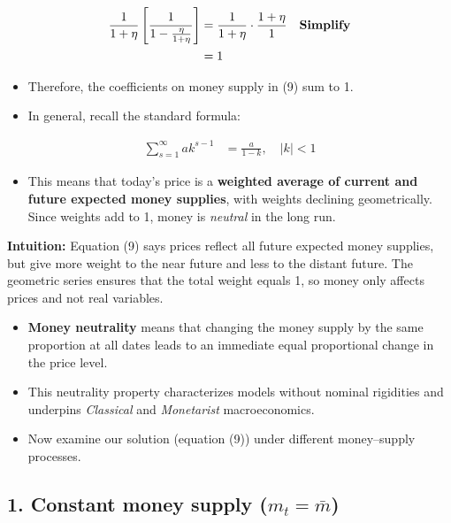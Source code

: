 \documentclass[12pt]{article}
\begin{document}
\singlespacing
\begin{align}
\frac{1}{1+\eta} \left[ \frac{1}{1 - \frac{\eta}{1+\eta}} \right] 
   &= \frac{1}{1+\eta} \cdot \frac{1+\eta}{1} && \text{\textbf{Simplify}} \\
   &= 1
\end{align}

\begin{itemize}
    \item Therefore, the coefficients on money supply in (9) sum to 1.  
    \item In general, recall the standard formula:  
\end{itemize}

\singlespacing
\begin{align}
\sum_{s=1}^{\infty} a k^{s-1} &= \frac{a}{1-k}, \quad |k| < 1
\end{align}

\begin{itemize}
    \item This means that today’s price is a \textbf{weighted average of current and future expected money supplies}, with weights declining geometrically. Since weights add to 1, money is \textit{neutral} in the long run.  
\end{itemize}

\textbf{Intuition:} Equation (9) says prices reflect all future expected money supplies, but give more weight to the near future and less to the distant future. The geometric series ensures that the total weight equals 1, so money only affects prices and not real variables.

\begin{itemize}
    \item \textbf{Money neutrality} means that changing the money supply by the same proportion at all dates leads to an immediate equal proportional change in the price level.  
    \item This neutrality property characterizes models without nominal rigidities and underpins \textit{Classical} and \textit{Monetarist} macroeconomics.  
    \item Now examine our solution (equation (9)) under different money–supply processes.  
\end{itemize}

\subsection*{\noindent\textbf{1. Constant money supply ($m_t=\bar m$)}}
\end{document}
